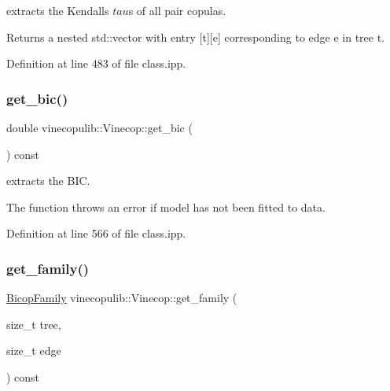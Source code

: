 extracts the Kendall\textquotesingle{}s $ tau $s of all pair copulas. 

\begin{DoxyReturn}{Returns}
a nested std\+::vector with entry {\ttfamily \mbox{[}t\mbox{]}\mbox{[}e\mbox{]}} corresponding to edge {\ttfamily e} in tree {\ttfamily t}. 
\end{DoxyReturn}


Definition at line 483 of file class.\+ipp.

\mbox{\label{classvinecopulib_1_1_vinecop_a29d0beb8d6c20c246c7b86f38d90e48d}} 
\subsubsection{\texorpdfstring{get\+\_\+bic()}{get\_bic()}}
{\footnotesize\ttfamily double vinecopulib\+::\+Vinecop\+::get\+\_\+bic (\begin{DoxyParamCaption}{ }\end{DoxyParamCaption}) const\hspace{0.3cm}{\ttfamily [inline]}}



extracts the B\+IC. 

The function throws an error if model has not been fitted to data. 

Definition at line 566 of file class.\+ipp.

\mbox{\label{classvinecopulib_1_1_vinecop_a5c909eae77a38558d46d6d4b98564e57}} 
\subsubsection{\texorpdfstring{get\+\_\+family()}{get\_family()}}
{\footnotesize\ttfamily \hyperlink{namespacevinecopulib_a42e95cc06d33896199caab0c11ad44f3}{Bicop\+Family} vinecopulib\+::\+Vinecop\+::get\+\_\+family (\begin{DoxyParamCaption}\item[{size\+\_\+t}]{tree,  }\item[{size\+\_\+t}]{edge }\end{DoxyParamCaption}) const\hspace{0.3cm}{\ttfamily [inline]}}



